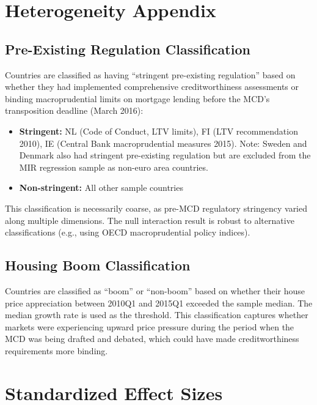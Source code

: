 \documentclass[12pt]{article}
\begin{document}
\section{Heterogeneity Appendix}
\label{app:het}

\subsection{Pre-Existing Regulation Classification}

Countries are classified as having ``stringent pre-existing regulation'' based on whether they had implemented comprehensive creditworthiness assessments or binding macroprudential limits on mortgage lending before the MCD's transposition deadline (March 2016):

\begin{itemize}
\item \textbf{Stringent:} NL (Code of Conduct, LTV limits), FI (LTV recommendation 2010), IE (Central Bank macroprudential measures 2015). Note: Sweden and Denmark also had stringent pre-existing regulation but are excluded from the MIR regression sample as non-euro area countries.
\item \textbf{Non-stringent:} All other sample countries
\end{itemize}

This classification is necessarily coarse, as pre-MCD regulatory stringency varied along multiple dimensions. The null interaction result is robust to alternative classifications (e.g., using OECD macroprudential policy indices).

\subsection{Housing Boom Classification}

Countries are classified as ``boom'' or ``non-boom'' based on whether their house price appreciation between 2010Q1 and 2015Q1 exceeded the sample median. The median growth rate is used as the threshold. This classification captures whether markets were experiencing upward price pressure during the period when the MCD was being drafted and debated, which could have made creditworthiness requirements more binding.


\section{Standardized Effect Sizes}
\label{app:sde}
\label{sec:sde}


\end{document}
